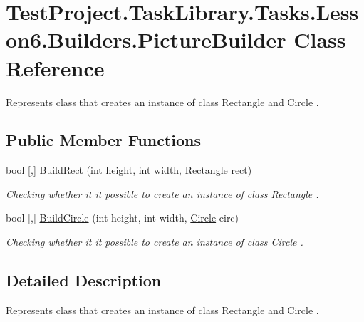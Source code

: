 \hypertarget{class_test_project_1_1_task_library_1_1_tasks_1_1_lesson6_1_1_builders_1_1_picture_builder}{}\section{Test\+Project.\+Task\+Library.\+Tasks.\+Lesson6.\+Builders.\+Picture\+Builder Class Reference}
\label{class_test_project_1_1_task_library_1_1_tasks_1_1_lesson6_1_1_builders_1_1_picture_builder}


Represents class that creates an instance of class Rectangle and Circle .  


\subsection*{Public Member Functions}
\begin{DoxyCompactItemize}
\item 
bool \mbox{[},\mbox{]} \mbox{\hyperlink{class_test_project_1_1_task_library_1_1_tasks_1_1_lesson6_1_1_builders_1_1_picture_builder_abc6426a7cab55def6fa426e04e1b2d84}{Build\+Rect}} (int height, int width, \mbox{\hyperlink{class_test_project_1_1_task_library_1_1_tasks_1_1_lesson6_1_1_models_1_1_rectangle}{Rectangle}} rect)
\begin{DoxyCompactList}\small\item\em Checking whether it it possible to create an instance of class Rectangle . \end{DoxyCompactList}\item 
bool \mbox{[},\mbox{]} \mbox{\hyperlink{class_test_project_1_1_task_library_1_1_tasks_1_1_lesson6_1_1_builders_1_1_picture_builder_a84732ef423f16c7a4dd0568b8f0d65bb}{Build\+Circle}} (int height, int width, \mbox{\hyperlink{class_test_project_1_1_task_library_1_1_tasks_1_1_lesson6_1_1_models_1_1_circle}{Circle}} circ)
\begin{DoxyCompactList}\small\item\em Checking whether it it possible to create an instance of class Circle . \end{DoxyCompactList}\end{DoxyCompactItemize}


\subsection{Detailed Description}
Represents class that creates an instance of class Rectangle and Circle . 



